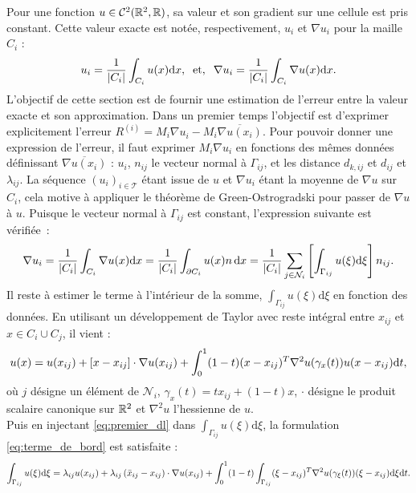 \documentclass[12pt,a4paper]{article}
\begin{document}
	Pour une fonction $u \in \mathcal C^2(\mathbb{R}^2,\mathbb{R})$, sa valeur et son gradient sur une cellule est pris constant. Cette valeur exacte est notée, respectivement, $u_i$ et $\nabla u_i$ pour la maille $C_i$ :
	\begin{equation}
		u_i = \dfrac1{\left\lvert C_i \right\rvert}\displaystyle\int_{C_i} u(x)\mathrm dx,\;\; \text{et},\;\; \nabla u_i = \dfrac1{\left\lvert C_i \right\rvert}\displaystyle\int_{C_i} \nabla u(x)\mathrm dx.
	\end{equation}
	L'objectif de cette section est de fournir une estimation de l'erreur entre la valeur exacte et son approximation. Dans un premier temps l'objectif est d'exprimer explicitement l'erreur $R^{(i)} = M_i  {\nabla u}_i - M_i  {\overline{ {\nabla u}(x_i)}}$. Pour pouvoir donner une expression de l'erreur, il faut exprimer $M_i\nabla u_i$ en fonctions des mêmes données définissant $\overline{\nabla u(x_i)}$ : $u_i$, $n_{ij}$ le vecteur normal à $\Gamma_{ij}$, et les distance $d_{k,ij}$ et $d_{ij}$ et $\lambda_{ij}$. La séquence $(u_i)_{i\in\mathcal T}$ étant issue de $u$ et $\nabla u_i$ étant la moyenne de $\nabla u$ sur $C_i$, cela motive à appliquer le théorème de Green-Ostrogradski pour passer de $\nabla u$ à $u$. Puisque le vecteur normal à $\Gamma_{ij}$ est constant, l'expression suivante est vérifiée :
	\begin{equation}\label{eq:objectif}
		\nabla u_i = \dfrac1{\left\lvert C_i \right\rvert}\displaystyle\int_{C_i}  \nabla u(x) \mathrm dx = \dfrac1{\left\lvert C_i \right\rvert}\int_{\partial C_i} u(x)n\,\mathrm d  x = \dfrac1{\left\lvert C_i \right\rvert}\sum_{j \in \mathcal N_i} \left[\int_{\Gamma_{ij}} u( \xi)\mathrm d \xi\right]  {n_{ij}}.
	\end{equation}
	Il reste à estimer le terme à l'intérieur de la somme, $\displaystyle\int_{\Gamma_{ij}} u( \xi)\mathrm d \xi$ en fonction des données. En utilisant un développement de Taylor avec reste intégral entre $x_{ij}$ et $x \in C_i\cup C_j$, il vient :
	\begin{equation}\label{eq:premier_dl}
		u(  x) = u(  x_{ij}) + \left[ {x-x_{ij}}\right]\cdot {\nabla u}(x_{ij}) + \displaystyle\int_0^1 (1-t)( {x-x_{ij}})^T\nabla^2 u(\gamma_x(t))u ( {x-x_{ij}}) \mathrm dt,
	\end{equation}
	où $j$ désigne un élément de $\mathcal N_i$, $\gamma_x(t) = tx_{ij} + (1-t)x$, $\cdot$ désigne le produit scalaire canonique sur $\mathbb{R}^2$ et $\nabla^2 u$ l'hessienne de $u$.\\	
	Puis en injectant \eqref{eq:premier_dl} dans $\displaystyle\int_{\Gamma_{ij}} u( \xi)\mathrm d \xi$, la formulation \eqref{eq:terme_de_bord} est satisfaite :
	\begin{equation}\label{eq:terme_de_bord}
		\displaystyle\int_{\Gamma_{ij}} u( \xi)\mathrm d \xi = \lambda_{ij}u(x_{ij}) + \lambda_{ij}\left( {\bar x_{ij}-  x_{ij}}\right)\cdot {\nabla u}(  x_{ij}) + \displaystyle\int_0^1 (1-t)\int_{\Gamma_{ij}} ( \xi-x_{ij})^T\nabla^2 u(\gamma_{ \xi}(t)) ( \xi-  x_{ij})\mathrm d \xi \mathrm dt.
   \end{equation}
   
\end{document}
